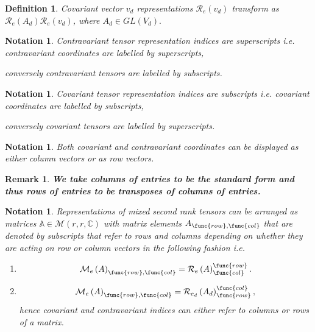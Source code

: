 \documentclass[aps,preprint]{revtex4}
\newtheorem{definition}[theorem]{Definition}
\newtheorem{notation}[theorem]{Notation}
\newtheorem{remark}[theorem]{Remark}
\begin{document}
\begin{definition}
\emph{Covariant} vector $v_{d}$ representations $\mathcal{R}_{e}\left(
v_{d}\right) $ transform as $\mathcal{R}_{e}\left( A_{d}\right) \mathcal{R}%
_{e}\left( v_{d}\right) $, where $A_{d}\in GL\left( V_{d}\right) .$
\end{definition}

\begin{notation}
\emph{Contravariant} tensor representation indices are superscripts i.e.
contravariant coordinates are labelled by superscripts,

\emph{conversely contravariant }tensors are labelled by subscripts.
\end{notation}

\begin{notation}
\emph{Covariant} tensor representation indices are subscripts i.e. covariant
coordinates are labelled by subscripts,

\emph{conversely covariant} tensors are labelled by superscripts.
\end{notation}

\begin{notation}
Both covariant and contravariant coordinates can be displayed as either
column vectors or as row vectors.
\end{notation}

\begin{remark}
\textbf{We take columns of entries to be the standard form and thus rows of
entries to be transposes of columns of entries.}
\end{remark}

\begin{notation}
Representations of mixed second rank tensors can be arranged as matrices $%
\mathbb{A}\in \mathcal{M}\left( r,r,\mathbb{C}\right) $ with matrix elements 
$A_{\func{row},\func{col}}$ that are denoted by subscripts that refer to
rows and columns depending on whether they are acting on row or column
vectors in the following fashion i.e.

\begin{enumerate}
\item 
\begin{equation}
\mathcal{M}_{e}\left( A\right) _{\func{row},\func{col}}=\mathcal{R}%
_{e}\left( A\right) _{\func{col}}^{\func{row}}.
\end{equation}

\item 
\begin{equation}
\mathcal{M}_{e}\left( A\right) _{\func{row},\func{col}}=\mathcal{R}%
_{e_{d}}\left( A_{d}\right) _{\func{row}}^{\func{col}},
\end{equation}%
hence covariant and contravariant indices \emph{can either refer to} columns
or rows of a matrix.
\end{enumerate}
\end{notation}
\end{document}
